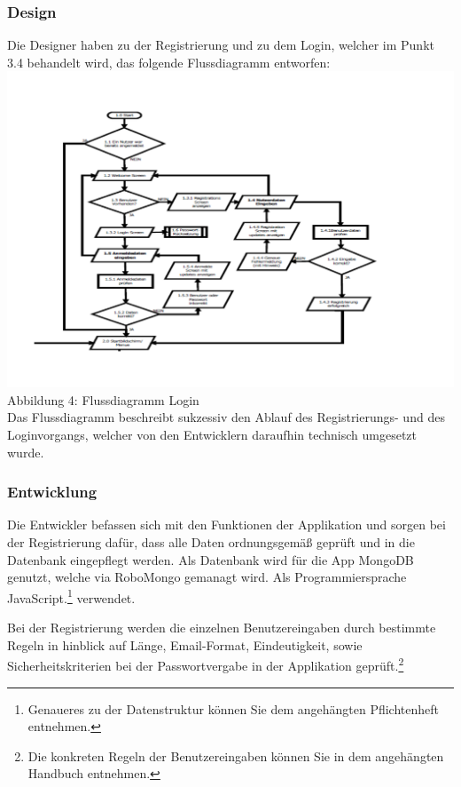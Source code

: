 \documentclass[12pt,a4paper]{article}
\begin{document}
\subsubsection*{Design}
Die Designer haben zu der Registrierung und zu dem Login, welcher im Punkt 3.4 behandelt wird, das folgende Flussdiagramm entworfen:
\\
\hspace*{-10mm} \includegraphics[trim = 17mm 0mm 0mm 20mm, clip, scale=0.8]{Login-PDF.pdf}
\footnotesize Abbildung 4: Flussdiagramm Login
\normalsize
\\
\linebreak
Das Flussdiagramm beschreibt sukzessiv den Ablauf des Registrierungs- und des Loginvorgangs, welcher von den Entwicklern daraufhin technisch umgesetzt wurde.
\newpage
\subsubsection*{Entwicklung}
Die Entwickler befassen sich mit den Funktionen der Applikation  und sorgen bei der Registrierung dafür, dass alle Daten ordnungsgemäß geprüft und in die Datenbank eingepflegt werden.
Als Datenbank wird für die App MongoDB genutzt, welche via RoboMongo gemanagt wird. Als Programmiersprache JavaScript.\footnote{Genaueres zu der Datenstruktur können Sie dem angehängten Pflichtenheft entnehmen.} verwendet.

Bei der Registrierung werden die einzelnen Benutzereingaben durch bestimmte Regeln in hinblick auf Länge, Email-Format, Eindeutigkeit, sowie Sicherheitskriterien bei der Passwortvergabe in der Applikation geprüft.\footnote{Die konkreten Regeln der Benutzereingaben können Sie in dem angehängten Handbuch entnehmen.}
\end{document}
